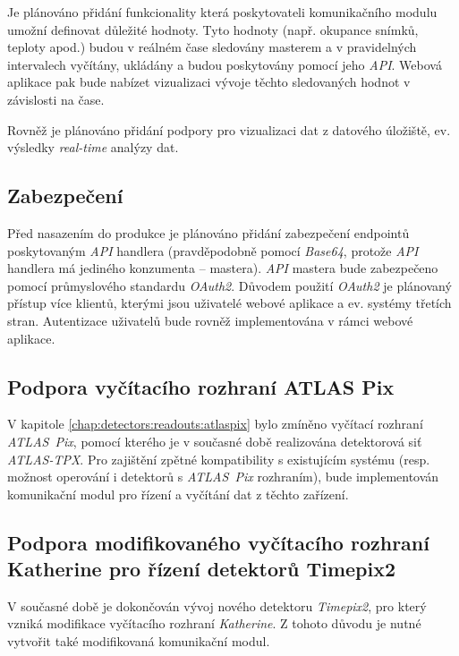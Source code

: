 Je plánováno přidání funkcionality která poskytovateli komunikačního modulu umožní definovat důležité hodnoty. Tyto hodnoty (např. okupance snímků, teploty apod.) budou v reálném čase sledovány masterem a v pravidelných intervalech vyčítány, ukládány a budou poskytovány pomocí jeho \textit{API}. Webová aplikace pak bude nabízet vizualizaci vývoje těchto sledovaných hodnot v závislosti na čase.

Rovněž je plánováno přidání podpory pro vizualizaci dat z datového úložiště, ev. výsledky \textit{real-time} analýzy dat.

\subsection{Zabezpečení}
Před nasazením do produkce je plánováno přidání zabezpečení endpointů poskytovaným \textit{API} handlera (pravděpodobně pomocí \textit{Base64}, protože \textit{API} handlera má jediného konzumenta -- mastera). \textit{API} mastera bude zabezpečeno pomocí průmyslového standardu \textit{OAuth2}. Důvodem použití \textit{OAuth2} je plánovaný přístup více klientů, kterými jsou uživatelé webové aplikace a ev. systémy třetích stran. Autentizace uživatelů bude rovněž implementována v rámci webové aplikace.

\subsection{Podpora vyčítacího rozhraní ATLAS Pix}
V kapitole \ref{chap:detectors:readouts:atlaspix} bylo zmíněno vyčítací rozhraní \textit{ATLAS~Pix}, pomocí kterého je v současné době realizována detektorová siť \textit{ATLAS-TPX}. Pro zajištění zpětné kompatibility s existujícím systému (resp. možnost operování i detektorů s \textit{ATLAS~Pix} rozhraním), bude implementován komunikační modul pro řízení a vyčítání dat z těchto zařízení.

\subsection{Podpora modifikovaného vyčítacího rozhraní Katherine pro řízení detektorů Timepix2}
V současné době je dokončován vývoj nového detektoru \textit{Timepix2}, pro který vzniká modifikace vyčítacího rozhraní \textit{Katherine}.
Z tohoto důvodu je nutné vytvořit také modifikovaná komunikační modul.
